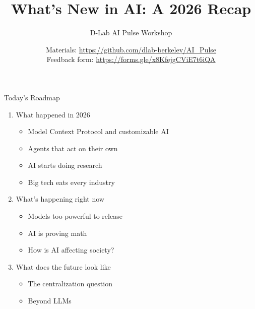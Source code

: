 \documentclass[aspectratio=169]{beamer}
\title{What's New in AI: A 2026 Recap}
\subtitle{D-Lab AI Pulse Workshop}
\author[D-Lab]{Materials: \url{https://github.com/dlab-berkeley/AI_Pulse}\\Feedback form: \url{https://forms.gle/x8KfejgCViE7t6iQA}}
\date{}
\begin{document}
\begin{frame}[plain]
    \titlepage
\end{frame}


\begin{frame}{Today's Roadmap}
    \begin{enumerate}
        \item What happened in 2026
        \begin{itemize}
            \item Model Context Protocol and customizable AI
            \item Agents that act on their own
            \item AI starts doing research
            \item Big tech eats every industry
        \end{itemize}
        \vspace{0.4em}
        \item What's happening right now
        \begin{itemize}
            \item Models too powerful to release
            \item AI is proving math
            \item How is AI affecting society?
        \end{itemize}
        \vspace{0.4em}
        \item What does the future look like
        \begin{itemize}
            \item The centralization question
            \item Beyond LLMs
        \end{itemize}
    \end{enumerate}
\end{frame}

\end{document}
